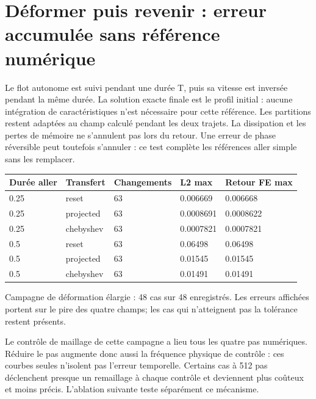 \documentclass[10pt,a4paper]{article}
\begin{document}
\section{Déformer puis revenir : erreur accumulée sans référence numérique}
Le flot autonome est suivi pendant une durée T, puis sa vitesse est inversée pendant la même durée. La solution exacte finale est le profil initial : aucune intégration de caractéristiques n'est nécessaire pour cette référence. Les partitions restent adaptées au champ calculé pendant les deux trajets. La dissipation et les pertes de mémoire ne s'annulent pas lors du retour. Une erreur de phase réversible peut toutefois s'annuler : ce test complète les références aller simple sans les remplacer.

\begin{center}\small\begin{tabular}{lllll}\toprule
Durée aller & Transfert & Changements & L2 max & Retour FE max\\\midrule
0.25 & reset & 63 & 0.006669 & 0.006668\\
0.25 & projected & 63 & 0.0008691 & 0.0008622\\
0.25 & chebyshev & 63 & 0.0007821 & 0.0007821\\
0.5 & reset & 63 & 0.06498 & 0.06498\\
0.5 & projected & 63 & 0.01545 & 0.01545\\
0.5 & chebyshev & 63 & 0.01491 & 0.01491\\
\bottomrule\end{tabular}\end{center}
Campagne de déformation élargie : 48 cas sur 48 enregistrés. Les erreurs affichées portent sur le pire des quatre champs; les cas qui n'atteignent pas la tolérance restent présents.

Le contrôle de maillage de cette campagne a lieu tous les quatre pas numériques. Réduire le pas augmente donc aussi la fréquence physique de contrôle : ces courbes seules n'isolent pas l'erreur temporelle. Certains cas à 512 pas déclenchent presque un remaillage à chaque contrôle et deviennent plus coûteux et moins précis. L'ablation suivante teste séparément ce mécanisme.
\end{document}
